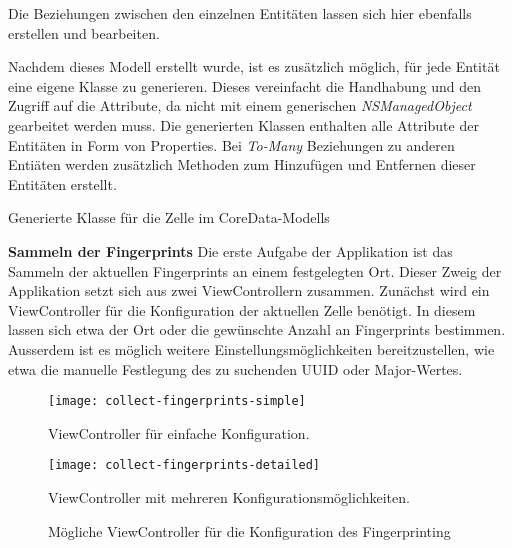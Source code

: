 Die Beziehungen zwischen den einzelnen Entitäten lassen sich hier ebenfalls erstellen und bearbeiten. 

Nachdem dieses Modell erstellt wurde, ist es zusätzlich möglich, für jede Entität eine eigene Klasse zu generieren. Dieses vereinfacht die Handhabung und den Zugriff auf die Attribute, da nicht mit einem generischen \emph{NSManagedObject} gearbeitet werden muss. Die generierten Klassen enthalten alle Attribute der Entitäten in Form von Properties. Bei \emph{To-Many} Beziehungen zu anderen Entiäten werden zusätzlich Methoden zum Hinzufügen und Entfernen dieser Entitäten erstellt.

\begin{listing}[htb!]
	\caption{Generierte Klasse für die Zelle im CoreData-Modells}
	\label{lst:cell_objc}
\end{listing}
  

\textbf{Sammeln der Fingerprints}
Die erste Aufgabe der Applikation ist das Sammeln der aktuellen Fingerprints an einem festgelegten Ort. Dieser Zweig der Applikation setzt sich aus zwei ViewControllern zusammen. Zunächst wird ein ViewController für die Konfiguration der aktuellen Zelle benötigt. In diesem lassen sich etwa der Ort oder die gewünschte Anzahl an Fingerprints bestimmen. Ausserdem ist es möglich weitere Einstellungsmöglichkeiten bereitzustellen, wie etwa die manuelle Festlegung des zu suchenden UUID oder Major-Wertes. 

\begin{figure}[h!]
	\centering
	\begin{minipage}[t]{5cm}
		\texttt{[image: collect-fingerprints-simple]}
		\caption{ViewController für einfache Konfiguration.}
		\label{collect-fingerprints-simple}
	\end{minipage}
	\hspace{2cm}
	\begin{minipage}[t]{5cm}
			\texttt{[image: collect-fingerprints-detailed]}
			\caption{ViewController mit mehreren Konfigurationsmöglichkeiten.}
			\label{collect-fingerprints-detailed}
	\end{minipage}
		\caption{Mögliche ViewController für die Konfiguration des Fingerprinting}
		\label{collect-fingerprints}
\end{figure}


